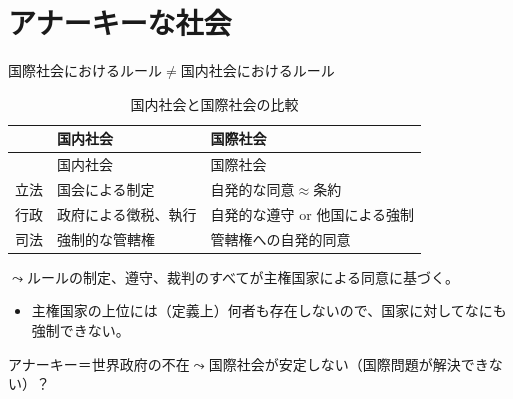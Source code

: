 \documentclass[
  xelatex,
  ja=standard]{bxjsarticle}
\providecommand{\tightlist}{%
  \setlength{\itemsep}{0pt}\setlength{\parskip}{0pt}}\usepackage{longtable,booktabs,array}
\begin{document}
\hypertarget{ux30a2ux30caux30fcux30adux30fcux306aux793eux4f1a}{%
\section{アナーキーな社会}\label{ux30a2ux30caux30fcux30adux30fcux306aux793eux4f1a}}

国際社会におけるルール\(\neq\)国内社会におけるルール

\begin{longtable}[]{@{}lll@{}}
\caption{国内社会と国際社会の比較}\tabularnewline
\toprule\noalign{}
& 国内社会 & 国際社会 \\
\midrule\noalign{}
\endfirsthead
\toprule\noalign{}
& 国内社会 & 国際社会 \\
\midrule\noalign{}
\endhead
\bottomrule\noalign{}
\endlastfoot
立法 & 国会による制定 & 自発的な同意\(\approx\)条約 \\
行政 & 政府による徴税、執行 & 自発的な遵守 or 他国による強制 \\
司法 & 強制的な管轄権 & 管轄権への自発的同意 \\
\end{longtable}

\(\leadsto\)ルールの制定、遵守、裁判のすべてが主権国家による同意に基づく。

\begin{itemize}
\tightlist
\item
  主権国家の上位には（定義上）何者も存在しないので、国家に対してなにも強制できない。
\end{itemize}

アナーキー＝世界政府の不在\(\leadsto\)国際社会が安定しない（国際問題が解決できない）？


  
\end{document}
